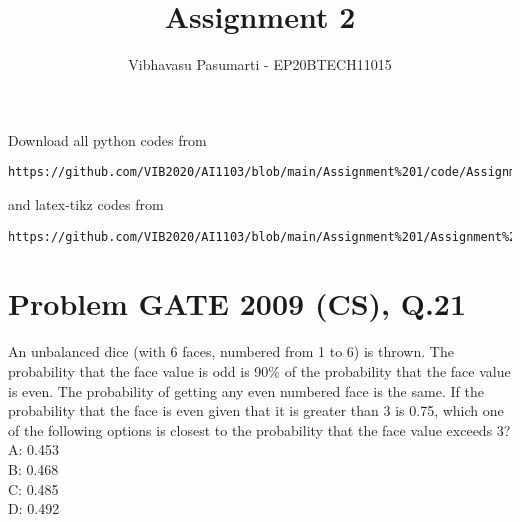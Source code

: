 \documentclass[journal,12pt,twocolumn]{IEEEtran}
\begin{document}
\title{Assignment 2}
\author{Vibhavasu Pasumarti - EP20BTECH11015}
\maketitle
\newpage
\bigskip
\renewcommand{\thefigure}{\theenumi}
\renewcommand{\thetable}{\theenumi}
Download all python codes from 
\begin{lstlisting}
https://github.com/VIB2020/AI1103/blob/main/Assignment%201/code/Assignment%202.py
\end{lstlisting}
%
and latex-tikz codes from 
%
\begin{lstlisting}
https://github.com/VIB2020/AI1103/blob/main/Assignment%201/Assignment%202.tex
\end{lstlisting}
\section{\Large Problem \large GATE 2009 (CS), Q.21}
An unbalanced dice (with 6 faces, numbered from 1 to 6) is thrown. The probability that the face value is odd is 90\% of the probability that the face value is even. The probability of getting any even numbered face is the same. If the probability that the face is even given that it is greater than 3 is 0.75, which one of the following options is closest to the probability that the face value exceeds 3?\\[7pt]
 A: 0.453\\
 B: 0.468\\
 C: 0.485\\
 D: 0.492\\
\end{document}
